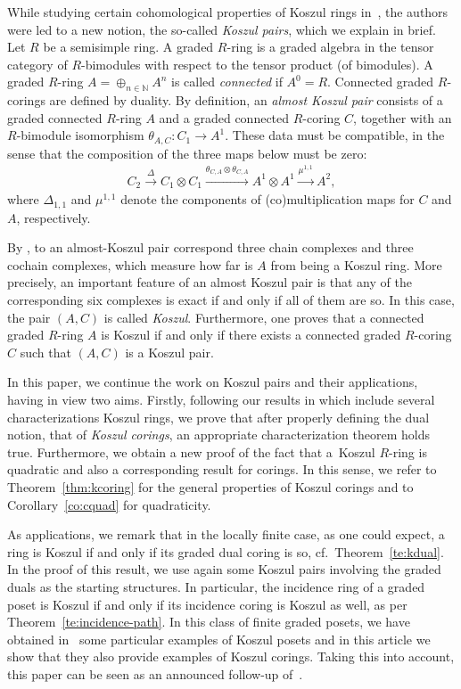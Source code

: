 \documentclass[pdftex]{sigma}
\newcommand\ot{\otimes}
\newcommand\op{\oplus}
\newcommand\bb{\mathbb}
\renewcommand{\^}[1]{\mbox{$^{\left( #1 \right)}$}}
\renewcommand{\_}[1]{\mbox{$_{\left( #1 \right)}$}}
\newcommand\xrar{\xrightarrow}
\numberwithin{equation}{section}
\begin{document}
While studying certain cohomological properties of Koszul rings in~\cite{jps}, the authors were led to a new notion, the so-called \emph{Koszul pairs}, which we explain in brief. Let $R$ be a semisimple ring. A graded $R$-ring is a graded algebra in the tensor category of $R$-bimodules with respect to the tensor product (of bimodules). A graded $R$-ring $A = \op_{n \in \bb{N}} A^n$ is called \emph{connected} if $A^0 = R$. Connected graded $R$-corings are def\/ined by duality. By def\/inition, an \emph{almost Koszul pair} consists of a graded connected $R$-ring $A$ and a graded connected $R$-coring $C$, together with an $R$-bimodule isomorphism $\theta_{A,C}\colon C_1 \to A^1$. These data must be compatible, in the sense that the composition of the three maps below must be zero:
\begin{gather}\label{ec:theta}
C_2 \xrar{\Delta} C_1 \ot C_1 \xrar{\theta_{C,A} \ot \theta_{C,A}} A^1 \ot A^1 \xrar{\mu^{1,1}} A^2,	
\end{gather}
where $\Delta_{1,1}$ and $\mu^{1,1}$ denote the components of (co)multiplication maps for $C$ and $A$, respectively.

By \cite{jps}, to an almost-Koszul pair correspond three chain complexes and three cochain complexes, which measure how far is $A$ from being a Koszul ring. More precisely, an important feature of an almost Koszul pair is that any of the corresponding six complexes is exact if and only if all of them are so. In this case, the pair $(A,C)$ is called \emph{Koszul}. Furthermore, one proves that a connected graded $R$-ring $A$ is Koszul if and only if there exists a connected graded $R$-coring $C$ such that $(A,C)$ is a Koszul pair.

In this paper, we continue the work on Koszul pairs and their applications, having in view two aims. Firstly, following our results in \cite{mst} which include several characterizations Koszul rings, we prove that after properly def\/ining the dual notion, that of \emph{Koszul corings}, an appropriate characterization theorem holds true. Furthermore, we obtain a new proof of the fact that a~Koszul $R$-ring is quadratic and also a corresponding result for corings. In this sense, we refer to Theorem~\ref{thm:kcoring} for the general properties of Koszul corings and to Corollary~\ref{co:cquad} for quadraticity.

As applications, we remark that in the locally f\/inite case, as one could expect, a ring is Koszul if and only if its graded dual coring is so, cf.\ Theorem~\ref{te:kdual}. In the proof of this result, we use again some Koszul pairs involving the graded duals as the starting structures. In particular, the incidence ring of a graded poset is Koszul if and only if its incidence coring is Koszul as well, as per Theorem~\ref{te:incidence-path}. In this class of f\/inite graded posets, we have obtained in~\cite{mst} some particular examples of Koszul posets and in this article we show that they also provide examples of Koszul corings. Taking this into account, this paper can be seen as an announced follow-up of~\cite{mst}.
\end{document}
